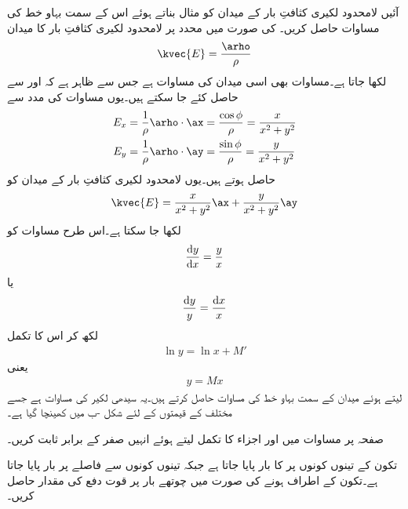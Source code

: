 آئیں لامحدود لکیری کثافتِ بار کے میدان کو مثال بناتے ہوئے اس  کے سمت بہاو خط کی مساوات حاصل کریں۔ کی صورت میں  محدد پر لامحدود لکیری کثافتِ بار کا میدان
\begin{align}\label{مساوات_کولمب_لکیری_میدان_دوبارہ}
\kvec{E}=\frac{\arho}{\rho}
\end{align}
لکھا جاتا ہے۔مساوات  بھی اسی میدان کی مساوات ہے جس سے ظاہر ہے کہ  اور  سے حاصل کئے جا سکتے ہیں۔یوں مساوات  کی مدد سے
\begin{align*}
E_x&=\frac{1}{\rho} \arho \cdot \ax=\frac{\cos \phi}{\rho}=\frac{x}{x^2+y^2}\\
E_y&=\frac{1}{\rho} \arho \cdot \ay=\frac{\sin \phi}{\rho}=\frac{y}{x^2+y^2}
\end{align*} 
حاصل ہوتے ہیں۔یوں لامحدود لکیری کثافتِ بار کے میدان کو
\begin{align}
\kvec{E}=\frac{x}{x^2+y^2}\ax+\frac{y}{x^2+y^2}\ay
\end{align}
لکھا جا سکتا ہے۔اس طرح مساوات  کو
\begin{align*}
\frac{\dif y}{\dif x}=\frac{y}{x}
\end{align*}
یا
\begin{align*}
\frac{\dif y}{y}=\frac{\dif x}{x}
\end{align*}
لکھ کر اس کا تکمل
\begin{align*}
\ln y = \ln x +M'
\end{align*}
یعنی
\begin{align}
y=Mx
\end{align}
لیتے ہوئے میدان کے سمت بہاو خط کی مساوات حاصل کرتے ہیں۔یہ سیدھی لکیر کی مساوات ہے جسے مختلف  کے قیمتوں کے لئے شکل -ب میں کھینچا گیا ہے۔

\newpage
{}

صفحہ  پر مساوات  میں  اور  اجزاء کا تکمل لیتے ہوئے انہیں صفر کے برابر ثابت کریں۔

تکون کے تینوں کونوں پر  کا بار پایا جاتا ہے جبکہ تینوں کونوں سے  فاصلے پر  بار پایا جاتا ہے۔تکون کے اطراف  ہونے کی صورت میں چوتھے بار پر قوت دفع  کی مقدار حاصل کریں۔

